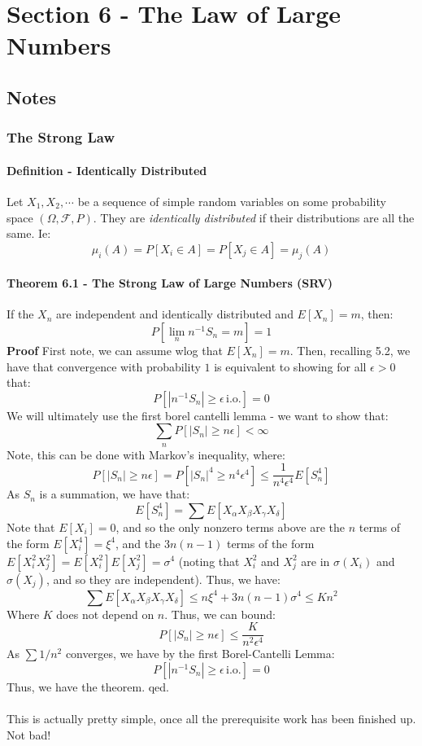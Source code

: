\documentclass[12pt,a4paper]{article}
\newcommand{\1}[1]{\mathbbm{1}\left\{ #1 \right\}}
\newcommand{\fcal}{\mathcal{F}}
\newcommand{\io}{\text{i.o.}}
\begin{document}
\section{Section 6 - The Law of Large Numbers}
\subsection{Notes}
\subsubsection{The Strong Law}

\paragraph{Definition - Identically Distributed} Let $X_1, X_2, \cdots$ be a sequence of simple random variables on some probability space $(\Omega, \fcal, P)$. They are \textit{identically distributed} if their distributions are all the same. Ie:
$$
	\mu_i(A) = P[X_i \in A] = P[X_j \in A] = \mu_j(A)
$$

\paragraph{Theorem 6.1 - The Strong Law of Large Numbers (SRV)} If the $X_n$ are independent and identically distributed and $E[X_n] = m$, then:
$$
	P\left[\lim_n n^{-1}S_n = m\right] = 1
$$
\textbf{Proof} First note, we can assume wlog that $E[X_n] = m$. Then, recalling 5.2, we have that convergence with probability $1$ is equivalent to showing for all $\epsilon > 0$ that:
$$
	P\left[|n^{-1}S_n| \geq \epsilon \, \io\right] = 0
$$
We will ultimately use the first borel cantelli lemma - we want to show that:
$$
	\sum_n P\left[|S_n| \geq n\epsilon\right] < \infty
$$
Note, this can be done with Markov's inequality, where:
$$
	P\left[|S_n| \geq n\epsilon\right] =
	P\left[|S_n|^4 \geq n^4\epsilon^4\right] \leq \frac{1}{n^4\epsilon^4} E[S_n^4]
$$
As $S_n$ is a summation, we have that:
$$
	E[S_n^4] = \sum E[X_\alpha X_\beta X_\gamma X_\delta]
$$
Note that $E[X_i] = 0$, and so the only nonzero terms above are the $n$ terms of the form $E[X_i^4] = \xi^4$, and the $3n(n-1)$ terms of the form $E[X_i^2X_j^2] = E[X_i^2]E[X_j^2] = \sigma^4$ (noting that $X_i^2$ and $X_j^2$ are in $\sigma(X_i)$ and $\sigma(X_j)$, and so they are independent). Thus, we have:
$$
	\sum E[X_\alpha X_\beta X_\gamma X_\delta] \leq n\xi^4 + 3n(n-1)\sigma^4 \leq Kn^2
$$
Where $K$ does not depend on $n$. Thus, we can bound:
$$
	P\left[|S_n| \geq n\epsilon\right] \leq \frac{K}{n^2\epsilon^4}
$$
As $\sum 1/n^2$ converges, we have by the first Borel-Cantelli Lemma:
$$
	P\left[|n^{-1}S_n| \geq \epsilon \, \io\right] = 0
$$
Thus, we have the theorem. qed.
\\\\
This is actually pretty simple, once all the prerequisite work has been finished up. Not bad!
\end{document}
